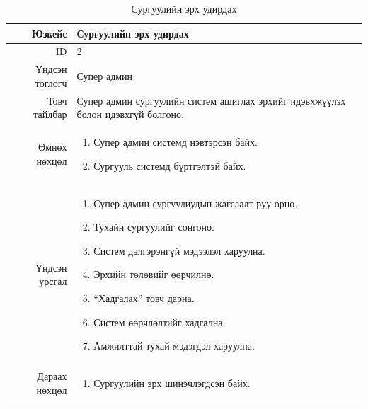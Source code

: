 \begin{longtable}{|r|p{11cm}|}
\caption{Сургуулийн эрх удирдах}
\label{table:usecase2}\\ \hline
Юзкейс & Сургуулийн эрх удирдах \\ \hline
ID & 2 \\ \hline
Үндсэн тоглогч & Супер админ \\ \hline
Товч тайлбар & Супер админ сургуулийн
систем ашиглах эрхийг идэвхжүүлэх болон
идэвхгүй болгоно. \\ \hline
Өмнөх нөхцөл &
\begin{enumerate}[nosep]
\item Супер админ системд нэвтэрсэн байх.
\item Сургууль системд бүртгэлтэй байх.
\end{enumerate} \\ \hline
Үндсэн урсгал &
\begin{enumerate}[nosep]
\item Супер админ сургуулиудын жагсаалт руу орно.
\item Тухайн сургуулийг сонгоно.
\item Систем дэлгэрэнгүй мэдээлэл харуулна.
\item Эрхийн төлөвийг өөрчилнө.
\item ``Хадгалах'' товч дарна.
\item Систем өөрчлөлтийг хадгална.
\item Амжилттай тухай мэдэгдэл харуулна.
\end{enumerate} \\ \hline
Дараах нөхцөл &
\begin{enumerate}[nosep]
\item Сургуулийн эрх шинэчлэгдсэн байх.
\end{enumerate} \\ \hline
\end{longtable}

